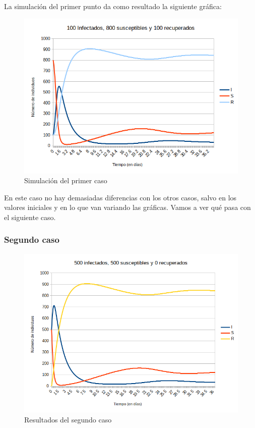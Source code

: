 \documentclass[11pt,a4paper]{report}
\begin{document}
La simulación del primer punto da como resultado la siguiente gráfica:

\begin{figure}[H]
\centering
\includegraphics[width=\textwidth]{img/sin_inmunidad/100i_800s_100r.png}
\caption{Simulación del primer caso}
\label{}
\end{figure}

En este caso no hay demasiadas diferencias con los otros casos, salvo en los valores iniciales y en lo que van variando las gráficas. Vamos a ver qué pasa con el siguiente caso.

\newpage
\subsubsection{Segundo caso}

\begin{figure}[H]
\centering
\includegraphics[width=\textwidth]{img/sin_inmunidad/500i_500s_0r.png}
\caption{Resultados del segundo caso}
\label{}
\end{figure}
\end{document}
